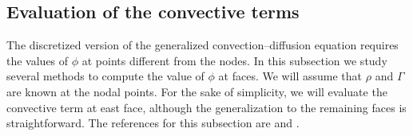 \subsection{Evaluation of the convective terms}

The discretized version of the generalized convection--diffusion equation
requires the values of $\phi$ at points different from the nodes. In this
subsection we study several methods to compute the value of $\phi$ at faces. We
will assume that $\rho$ and $\Gamma$ are known at the nodal points. For the sake
of simplicity, we will evaluate the convective term at east face, although the
generalization to the remaining faces is straightforward. The references for
this subsection are \cite{patankar2008numerical} and
\cite{ferziger2002computational4finite}.







